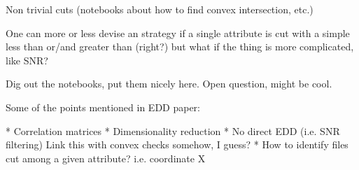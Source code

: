 Non trivial cuts (notebooks about how to find convex intersection, etc.)

One can more or less devise an strategy if a single attribute is cut with a simple
less than or/and greater than (right?) but what if the thing is more complicated,
like SNR?

Dig out the notebooks, put them nicely here. Open question, might be cool.

Some of the points mentioned in EDD paper:

* Correlation matrices
* Dimensionality reduction
* No direct EDD (i.e. SNR filtering) Link this with convex checks somehow, I guess?
* How to identify files cut among a given attribute? i.e. coordinate X

